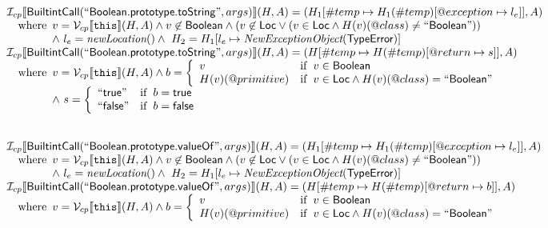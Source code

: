 \[
\begin{array}{l}
\I _{cp}\lbr \SF{BuiltintCall}(``\SF{Boolean.prototype.toString}",args)\rbr(H,A)
  = (H_1[\#temp \mapsto H_1(\#temp)[@exception \mapsto l_e]], A)\\
\quad\wherec{
  v = \V _{cp}\lbr \TT{this}\rbr (H,A) \land v \not\in \SF{Boolean} \land
  (v \not\in \SF{Loc} \lor (v \in \SF{Loc} \land H(v)(@class) \neq ``\SF{Boolean}"))\\
  \land\ l_e = \hf{newLocation}() \land\ H_2=H_1[l_e\mapsto\hf{NewExceptionObject}(\SF{TypeError})] 
  }\\

\I _{cp}\lbr \SF{BuiltintCall}(``\SF{Boolean.prototype.toString}",args)\rbr(H,A)
  = (H[\#temp \mapsto H(\#temp)[@return \mapsto s]], A)\\
\quad\wherec{
  v = \V _{cp}\lbr \TT{this}\rbr (H,A)
  \land b = \left\{
    \begin{array}{ll}
      v & \ifc{v \in \SF{Boolean}}\\
      H(v)(@primitive) & \ifc{v \in \SF{Loc} \land H(v)(@class) = ``\SF{Boolean}"}
    \end{array}\right.\\
  \land\ s = \left\{
    \begin{array}{ll}
      ``\SF{true}" & \ifc{b = \SF{true}}\\
      ``\SF{false}" & \ifc{b = \SF{false}}
    \end{array}\right.
  }\\
\\\\


\I _{cp}\lbr \SF{BuiltintCall}(``\SF{Boolean.prototype.valueOf}",args)\rbr(H,A)
  = (H_1[\#temp \mapsto H_1(\#temp)[@exception \mapsto l_e]], A)\\
\quad\wherec{
  v = \V _{cp}\lbr \TT{this}\rbr (H,A) \land v \not\in \SF{Boolean} \land
  (v \not\in \SF{Loc} \lor (v \in \SF{Loc} \land H(v)(@class) \neq ``\SF{Boolean}"))\\
  \land\ l_e = \hf{newLocation}() \land\ H_2=H_1[l_e\mapsto\hf{NewExceptionObject}(\SF{TypeError})] 
  }\\

\I _{cp}\lbr \SF{BuiltintCall}(``\SF{Boolean.prototype.valueOf}",args)\rbr(H,A)
  = (H[\#temp \mapsto H(\#temp)[@return \mapsto b]], A)\\
\quad\wherec{
  v = \V _{cp}\lbr \TT{this}\rbr (H,A)
  \land b = \left\{
    \begin{array}{ll}
      v & \ifc{v \in \SF{Boolean}}\\
      H(v)(@primitive) & \ifc{v \in \SF{Loc} \land H(v)(@class) = ``\SF{Boolean}"}
    \end{array}\right.
  }\\
\\\\

\end{array}
\]


